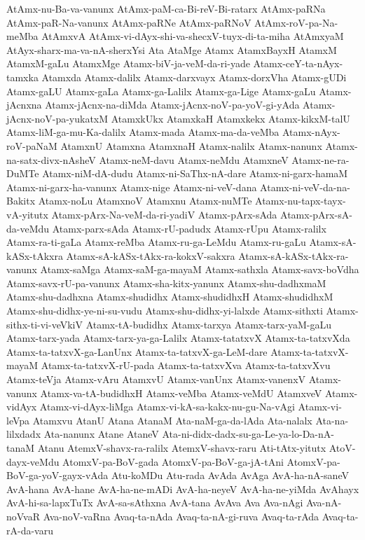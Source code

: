 {AtAmx-nu-Ba-va-vanunx
AtAmx-paM-ca-Bi-reV-Bi-ratarx
AtAmx-paRNa
AtAmx-paR-Na-vanunx
AtAmx-paRNe
AtAmx-paRNoV
AtAmx-roV-pa-Na-meMba
AtAmxvA
AtAmx-vi-dAyx-shi-va-shecxV-tuyx-di-ta-miha
AtAmxyaM
AtAyx-sharx-ma-va-nA-sherxYsi
Ata
AtaMge
Atamx
AtamxBayxH
AtamxM
AtamxM-gaLu
AtamxMge
Atamx-biV-ja-veM-da-ri-yade
Atamx-ceY-ta-nAyx-tamxka
Atamxda
Atamx-dalilx
Atamx-darxvayx
Atamx-dorxVha
Atamx-gUDi
Atamx-gaLU
Atamx-gaLa
Atamx-ga-Lalilx
Atamx-ga-Lige
Atamx-gaLu
Atamx-jAcnxna
Atamx-jAcnx-na-diMda
Atamx-jAcnx-noV-pa-yoV-gi-yAda
Atamx-jAcnx-noV-pa-yukatxM
AtamxkUkx
AtamxkaH
Atamxkekx
Atamx-kikxM-talU
Atamx-liM-ga-mu-Ka-dalilx
Atamx-mada
Atamx-ma-da-veMba
Atamx-nAyx-roV-paNaM
AtamxnU
Atamxna
AtamxnaH
Atamx-nalilx
Atamx-nanunx
Atamx-na-satx-divx-nAsheV
Atamx-neM-davu
Atamx-neMdu
AtamxneV
Atamx-ne-ra-DuMTe
Atamx-niM-dA-dudu
Atamx-ni-SaThx-nA-dare
Atamx-ni-garx-hamaM
Atamx-ni-garx-ha-vanunx
Atamx-nige
Atamx-ni-veV-dana
Atamx-ni-veV-da-na-Bakitx
Atamx-noLu
AtamxnoV
Atamxnu
Atamx-nuMTe
Atamx-nu-tapx-tayx-vA-yitutx
Atamx-pArx-Na-veM-da-ri-yadiV
Atamx-pArx-sAda
Atamx-pArx-sA-da-veMdu
Atamx-parx-sAda
Atamx-rU-padudx
Atamx-rUpu
Atamx-ralilx
Atamx-ra-ti-gaLa
Atamx-reMba
Atamx-ru-ga-LeMdu
Atamx-ru-gaLu
Atamx-sA-kASx-tAkxra
Atamx-sA-kASx-tAkx-ra-kokxV-sakxra
Atamx-sA-kASx-tAkx-ra-vanunx
Atamx-saMga
Atamx-saM-ga-mayaM
Atamx-sathxla
Atamx-savx-boVdha
Atamx-savx-rU-pa-vanunx
Atamx-sha-kitx-yanunx
Atamx-shu-dadhxmaM
Atamx-shu-dadhxna
Atamx-shudidhx
Atamx-shudidhxH
Atamx-shudidhxM
Atamx-shu-didhx-ye-ni-su-vudu
Atamx-shu-didhx-yi-lalxde
Atamx-sithxti
Atamx-sithx-ti-vi-veVkiV
Atamx-tA-budidhx
Atamx-tarxya
Atamx-tarx-yaM-gaLu
Atamx-tarx-yada
Atamx-tarx-ya-ga-Lalilx
Atamx-tatatxvX
Atamx-ta-tatxvXda
Atamx-ta-tatxvX-ga-LanUnx
Atamx-ta-tatxvX-ga-LeM-dare
Atamx-ta-tatxvX-mayaM
Atamx-ta-tatxvX-rU-pada
Atamx-ta-tatxvXva
Atamx-ta-tatxvXvu
Atamx-teVja
Atamx-vAru
AtamxvU
Atamx-vanUnx
Atamx-vanenxV
Atamx-vanunx
Atamx-va-tA-budidhxH
Atamx-veMba
Atamx-veMdU
AtamxveV
Atamx-vidAyx
Atamx-vi-dAyx-liMga
Atamx-vi-kA-sa-kakx-nu-gu-Na-vAgi
Atamx-vi-leVpa
Atamxvu
AtanU
Atana
AtanaM
Ata-naM-ga-da-lAda
Ata-nalalx
Ata-na-lilxdadx
Ata-nanunx
Atane
AtaneV
Ata-ni-didx-dadx-su-ga-Le-ya-lo-Da-nA-tanaM
Atanu
AtemxV-shavx-ra-ralilx
AtemxV-shavx-raru
Ati-tAtx-yitutx
AtoV-dayx-veMdu
AtomxV-pa-BoV-gada
AtomxV-pa-BoV-ga-jA-tAni
AtomxV-pa-BoV-ga-yoV-gayx-vAda
Atu-koMDu
Atu-rada
AvAda
AvAga
AvA-ha-nA-saneV
AvA-hana
AvA-hane
AvA-ha-ne-mADi
AvA-ha-neyeV
AvA-ha-ne-yiMda
AvAhayx
AvA-hi-sa-lapxTuTx
AvA-sa-sAthxna
AvA-tana
AvAva
Ava
Ava-nAgi
Ava-nA-noVvaR
Ava-noV-vaRna
Avaq-ta-nAda
Avaq-ta-nA-gi-ruva
Avaq-ta-rAda
Avaq-ta-rA-da-varu
}
